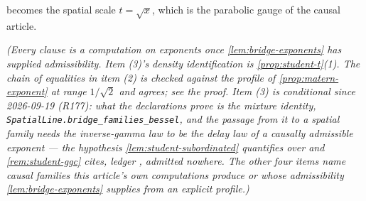 \begin{proposition}
\begin{enumerate}
becomes the spatial scale $t = \sqrt x$, which is the parabolic gauge of the causal article.
\end{enumerate}
\statusT\quad\emph{(Every clause is a computation on exponents once \ref{lem:bridge-exponents}
has supplied admissibility. Item (3)'s density identification is
\ref{prop:student-t}(1). The chain of equalities in item (2) is checked against the profile of
\ref{prop:matern-exponent} at range $1/\sqrt2$ and agrees; see the proof.
\emph{Item (3) is conditional} since 2026-09-19 (R177): what the declarations prove is the
mixture identity, \texttt{SpatialLine.bridge\_families\_bessel}, and the passage from it to a
spatial \emph{family} needs the inverse-gamma law to be the delay law of a causally admissible
exponent --- the hypothesis \ref{lem:student-subordinated} quantifies over and
\ref{rem:student-ggc} cites, ledger , admitted nowhere. The other four items name
causal families this article's own computations produce or whose admissibility
\ref{lem:bridge-exponents} supplies from an explicit profile.)}
\end{proposition}

